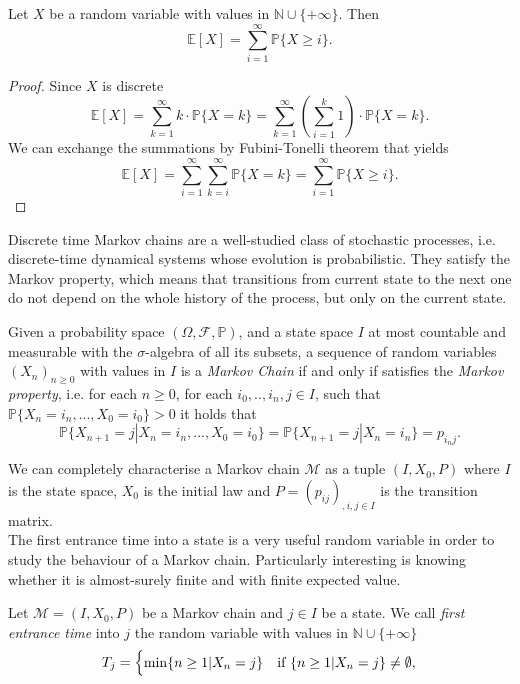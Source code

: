 \begin{LONG}
\begin{proposition}
		Let $X$ be a random variable with values in $\mathbb{N}\cup \{+\infty\}$. Then
		$$
		\mathbb{E}[X]=\sum\limits_{i=1}^{\infty} \mathbb{P}\{X\geq i\}.
		$$
	\end{proposition}
	\begin{proof}
		Since $X$ is discrete 
		$$
		\mathbb{E}[X]=\sum\limits_{k=1}^{\infty} k\cdot\mathbb{P}\{X=k\} =  \sum\limits_{k=1}^{\infty} \left( \sum\limits_{i=1}^{k} 1\right) \cdot\mathbb{P}\{X=k\}.
		$$
		We can exchange the summations by Fubini-Tonelli theorem that yields 
		$$
		\mathbb{E}[X]=\sum\limits_{i=1}^{\infty} \sum\limits_{k=i}^{\infty} \mathbb{P}\{X=k\} = \sum\limits_{i=1}^{\infty} \mathbb{P}\{X\geq i\}.
		$$
	\end{proof}
	Discrete time Markov chains are a well-studied class of stochastic processes, i.e. discrete-time dynamical systems whose evolution is probabilistic. They satisfy the Markov property, which means that transitions from current state to the next one do not depend on the whole history of the process, but only on the current state.
	\begin{definition}
		Given a probability space $(\Omega, \mathcal{F},\mathbb{P})$, and a state space $I$ at most countable and measurable with the $\sigma$-algebra of all its subsets, a sequence of random variables $(X_n)_{n\geq 0}$ with values in $I$ is a\emph{ Markov Chain} if and only if satisfies the \emph{Markov property}, i.e. for each $n\geq 0$, for each $i_0,..,i_n,j \in I$, such that $\mathbb{P}\{X_n=i_n,...,X_0=i_0\}>0$ it holds that
		$$
		\mathbb{P}\{X_{n+1}=j|X_n=i_n,...,X_0=i_0\}=\mathbb{P}\{X_{n+1}=j|X_n=i_n\}=p_{{i_n}j}.
		$$
	\end{definition}
	We can completely characterise a Markov chain $\mathcal{M}$ as a tuple $(I,X_0,P)$ where $I$ is the state space, $X_0$ is the initial law and $P=(p_{ij})_{,i,j\in I}$ is the transition matrix.\\
	The first entrance time into a state is a very useful random variable in order to study the behaviour of a Markov chain. Particularly interesting is knowing whether it is almost-surely finite and with finite expected value.
	\begin{definition}
		Let $\mathcal{M}=(I,X_0,P)$ be a Markov chain and $j\in I$ be a state. We call \emph{first entrance time} into $j$ the random variable with values in $\mathbb{N}\cup \{+\infty\}$
		$$
		T_j= \begin{cases}
		\min\{n\geq 1|X_n=j\} & \textnormal{if }\{n\geq 1|X_n=j\}\neq \emptyset,\\

\end{cases}$$
\end{definition}
\end{LONG}
